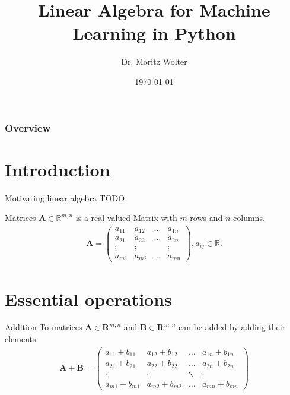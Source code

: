 \documentclass[notes]{beamer}
\title{Linear Algebra for Machine Learning in Python}
\date{\today}
\institute{High Performance Computing and Analytics Lab}
\author{Dr. Moritz Wolter}
\begin{document}
    \maketitle

    \begin{frame}
    \frametitle{Overview} 
    \tableofcontents
    \end{frame}

    \section{Introduction}
    \begin{frame}{Motivating linear algebra}
      TODO
    \end{frame}

    \begin{frame}{Matrices}
      $\mathbf{A} \in \mathbb{R}^{m,n}$ is a real-valued Matrix with $m$ rows and $n$ columns.
      \begin{align}
        \mathbf{A} = \begin{pmatrix}
          a_{11} & a_{12} & \dots & a_{1n} \\
          a_{21} & a_{22} & \dots & a_{2n} \\
          \vdots & \vdots &       & \vdots \\
          a_{m1} & a_{m2} & \dots & a_{mn}
        \end{pmatrix}
      , a_{ij} \in \mathbb{R}.
      \end{align}
     \end{frame}


    \section{Essential operations}
    \begin{frame}{Addition}
      To matrices $\mathbf{A} \in \mathbf{R}^{m,n}$ and $\mathbf{B} \in \mathbf{R}^{m,n}$ can be added by adding their elements.
      \begin{align}
        \mathbf{A} + \mathbf{B} =
        \begin{pmatrix}
            a_{11} + b_{11} & a_{12} + b_{12} & \dots & a_{1n} + b_{1n} \\
            a_{21} + b_{21} & a_{22} + b_{22} & \dots & a_{2n} + b_{2n} \\
            \vdots          & \vdots          & \ddots & \vdots         \\
            a_{m1} + b_{m1} & a_{m2} + b_{m2} & \dots & a_{mn} + b_{mn}
          \end{pmatrix}
        \end{align}
    \end{frame}
\end{document}
